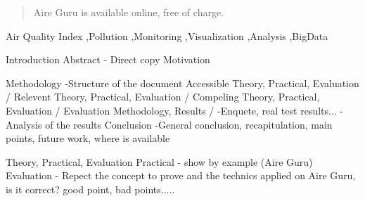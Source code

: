 \documentclass[final,2p,times]{elsarticle}
\begin{document}
\begin{frontmatter}
\begin{abstract}
Aire Guru is available online, free of charge.


\end{abstract}


\begin{keyword}
Air Quality Index \sep Pollution \sep Monitoring \sep Visualization \sep Analysis \sep BigData
\end{keyword}

\end{frontmatter}

Introduction 
    Abstract - Direct copy
    Motivation

Methodology -Structure of the document 
Accessible 
{ Theory, Practical, Evaluation } / 
Relevent 
{ Theory, Practical, Evaluation } / 
Compeling 
{ Theory, Practical, Evaluation } / 
Evaluation 
{ Methodology, Results } / 
-Enquete, real test results...
-Analysis of the results
Conclusion
-General conclusion, recapitulation, main points, future work, where is available

{ Theory, Practical, Evaluation }
Practical - show by example (Aire Guru)
Evaluation - Repect the concept to prove and the technics applied on Aire Guru, is it correct? good point, bad points.....
\end{document}

